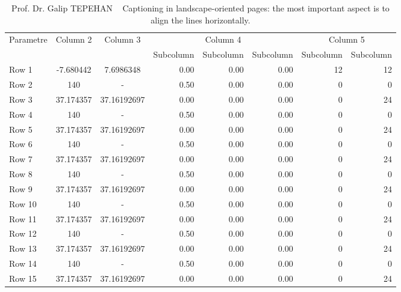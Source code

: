 
\begin{landscape}
\thispagestyle{empty}
 
\begin{table}
\vspace{-3mm}
{\setlength{\tabcolsep}{14pt}
\caption{Prof. Dr. Galip TEPEHAN  \,\,\, Captioning in landscape-oriented pages:
the most important aspect is to align the lines horizontally.}
\begin{center}
\vspace{-6mm}
\begin{tabular}{lccrrrrr}
\hline\hline
\multirow{2}{*}{Parametre} & \multirow{2}{*}{Column 2} & \multirow{2}{*}{Column 3} & \multicolumn{3}{c|}{Column 4} & \multicolumn{2}{c}{Column 5}\\ \cline{4-8}
  & & & Subcolumn & Subcolumn & Subcolumn & Subcolumn & Subcolumn\\
\hline
Row 1 & -7.680442 & 7.6986348 & 0.00 & 0.00 & 0.00 & 12 & 12 \\
Row 2 & 140 & - & 0.50 & 0.00 & 0.00 & 0 & 0 \\
Row 3 & 37.174357 & 37.16192697 & 0.00 & 0.00 & 0.00 & 0 & 24 \\
Row 4 & 140 & - & 0.50 & 0.00 & 0.00 & 0 & 0 \\
Row 5 & 37.174357 & 37.16192697 & 0.00 & 0.00 & 0.00 & 0 & 24 \\
Row 6 & 140 & - & 0.50 & 0.00 & 0.00 & 0 & 0 \\
Row 7 & 37.174357 & 37.16192697 & 0.00 & 0.00 & 0.00 & 0 & 24 \\
Row 8 & 140 & - & 0.50 & 0.00 & 0.00 & 0 & 0 \\
Row 9 & 37.174357 & 37.16192697 & 0.00 & 0.00 & 0.00 & 0 & 24 \\
Row 10 & 140 & - & 0.50 & 0.00 & 0.00 & 0 & 0 \\
Row 11 & 37.174357 & 37.16192697 & 0.00 & 0.00 & 0.00 & 0 & 24 \\
Row 12 & 140 & - & 0.50 & 0.00 & 0.00 & 0 & 0 \\
Row 13 & 37.174357 & 37.16192697 & 0.00 & 0.00 & 0.00 & 0 & 24 \\
Row 14 & 140 & - & 0.50 & 0.00 & 0.00 & 0 & 0 \\
Row 15 & 37.174357 & 37.16192697 & 0.00 & 0.00 & 0.00 & 0 & 24 \\
\end{tabular}
\end{center}
\begin{center}
      \vspace{53mm}
      \hspace{0cm}\pageref{table:galip}
      \label{table:galip}
\end{center}
}
\end{table}

\end{landscape}